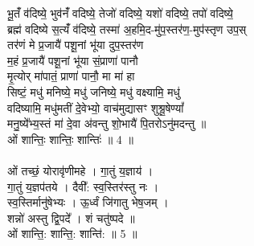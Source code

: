 भू॒तंँ व॑दिष्ये॒ भुव॑नंँ वदिष्ये॒ तेजो॑ वदिष्ये॒ यशो॑ वदिष्ये॒ तपो॑ वदिष्ये॒\\
ब्रह्म॑ वदिष्ये स॒त्यंँ व॑दिष्ये॒ तस्मा॑ अ॒हमि॒द-मु॑प॒स्तर॑ण॒-मुप॑स्तृण उप॒स् \\
तर॑णं मे प्र॒जायै॑ पशू॒नां भू॑या दुप॒स्तर॑ण \\
म॒हं प्र॒जायै॑ पशू॒नां भू॑या सं॒प्राणा॑ पानौ \\
मृ॒त्योर् मा॑पातं॒ प्राणा॑ पानौ॒ मा मा॑ हा \\
सिष्टं॒ मधु॑ मनिष्ये॒ मधु॑ जनिष्ये॒ मधु॑ वक्ष्यामि॒ मधु॑ \\
वदिष्यामि॒ मधु॑मतीं दे॒वेभ्यो॒ वाच॑मुद्यासꣳ शुश्रू॒षेण्यां᳚ \\
मनु॒ष्ये᳚भ्य॒स्तं मा॑ दे॒वा अ॑वन्तु शो॒भायै॑ पि॒तरोऽनु॑मदन्तु ॥ \\
ओं शान्तिः॒ शान्तिः॒ शान्तिः॑ ॥ 4 ॥\\
\\
ओं तच्छं॒ योरावृ॑णीमहे । गा॒तुं य॒ज्ञाय॑ ।\\
गा॒तुं य॒ज्ञप॑तये । दैवी᳚: स्व॒स्तिर॑स्तु नः ।\\
स्व॒स्तिर्मानु॑षेभ्यः । ऊ॒र्ध्वं जि॑गातु भेष॒जम् ।\\
शन्नो॑ अस्तु द्वि॒पदे᳚ । शं चतु॑ष्पदे ॥\\
ओं शान्ति॒: शान्ति॒: शान्ति॑: ॥ 5 ॥\\
